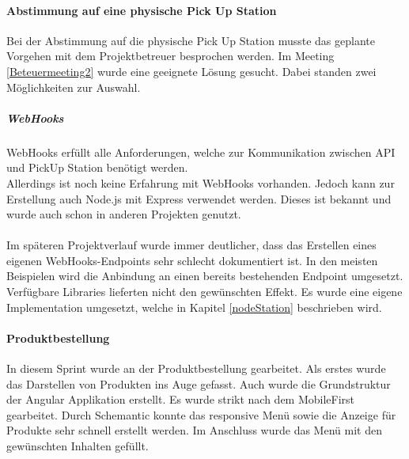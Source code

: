 \paragraph{Abstimmung auf eine physische Pick Up Station}
Bei der Abstimmung auf die physische Pick Up Station musste das geplante Vorgehen mit dem Projektbetreuer besprochen werden. Im Meeting \ref{Beteuermeeting2} wurde eine geeignete Lösung gesucht. Dabei standen zwei Möglichkeiten zur Auswahl. 
\subparagraph{WebHooks}
\gls{WebHooks} erfüllt alle Anforderungen, welche zur Kommunikation zwischen API und PickUp Station benötigt werden. \\Allerdings ist noch keine Erfahrung mit \gls{WebHooks} vorhanden. Jedoch kann zur Erstellung auch Node.js mit Express verwendet werden. Dieses ist bekannt und wurde auch schon in anderen Projekten genutzt.\\\\
Im späteren Projektverlauf wurde immer deutlicher, dass das Erstellen eines eigenen WebHooks-Endpoints sehr schlecht dokumentiert ist. In den meisten Beispielen wird die Anbindung an einen bereits bestehenden Endpoint umgesetzt. Verfügbare Libraries lieferten nicht den gewünschten Effekt. Es wurde eine eigene Implementation umgesetzt, welche in Kapitel \ref{nodeStation} beschrieben wird. 

\paragraph{Produktbestellung}
In diesem Sprint wurde an der Produktbestellung gearbeitet. Als erstes wurde das Darstellen von Produkten ins Auge gefasst. Auch wurde die Grundstruktur der Angular Applikation erstellt. 
Es wurde strikt nach dem MobileFirst gearbeitet. Durch Schemantic konnte das responsive Menü sowie die Anzeige für Produkte sehr schnell erstellt werden. Im Anschluss wurde das Menü mit den gewünschten Inhalten gefüllt. \\


